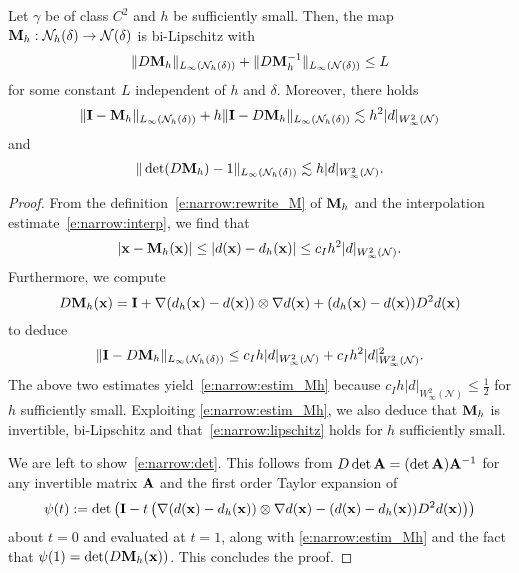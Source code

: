 \begin{lemma}[properties of $\bM_h$]\label{l:narrow:prop_Mh}
Let $\gamma$ be of class $C^2$ and $h$ be sufficiently small.
Then, the map ${\bf M}_h: \mathcal N_h(\delta) \rightarrow \mathcal N(\delta)$ is bi-Lipschitz with
\begin{equation} \label{e:narrow:lipschitz}
\| D{\bf M}_h \|_{L_\infty(\mathcal N_h(\delta))} + \| D{\bf M}_h^{-1} \|_{L_\infty(\mathcal N(\delta))} \leq L
\end{equation}
for some constant $L$ independent of $h$ and $\delta$.
Moreover, there holds
\begin{equation}\label{e:narrow:estim_Mh}
\| {\bf I} - {\bf M}_h \|_{L_\infty(\mathcal N_h(\delta))} + h  \| {\bf I} - D{\bf M}_h \|_{L_\infty(\mathcal N_h(\delta))} \lesssim h^2 | d |_{W^2_\infty(\mathcal N)}
\end{equation}
and
\begin{equation}\label{e:narrow:det}
\| \det(D {\bf M}_h) - 1 \|_{L_\infty(\mathcal N_h(\delta))}  \lesssim h | d |_{W^2_\infty(\mathcal N)}.
\end{equation}
\end{lemma}
\begin{proof}
From the definition~\eqref{e:narrow:rewrite_M} of $\bM_h$ and the interpolation estimate~\eqref{e:narrow:interp}, we find that
$$
| {\bf x} - {\bf M}_h({\bf x}) | \leq  | d({\bf x}) - d_h({\bf x}) | \leq c_I   h^2 | d |_{W^2_\infty(\mathcal N)}.
$$
Furthermore, we compute
$$
D{\bf M}_h({\bf x}) = {\bf I} + \nabla (d_h({\bf x})-d({\bf x})) \otimes \nabla d({\bf x})
+ (d_h({\bf x}) - d({\bf x})) D^2d({\bf x})
$$
to deduce
$$
\| {\bf I} - D{\bf M}_h \|_{L_\infty(\mathcal N_h(\delta))} \leq c_I h | d |_{W^2_\infty(\mathcal N)}
+ c_I h^2 | d |_{W^2_\infty(\mathcal N)}^2.
$$
%
The above two estimates yield~\eqref{e:narrow:estim_Mh} because $c_Ih| d |_{W^2_\infty(\mathcal N)}\le\frac12$ for $h$ sufficiently small. Exploiting \eqref{e:narrow:estim_Mh}, we also deduce that $\bM_h$ is invertible, bi-Lipschitz and that~\eqref{e:narrow:lipschitz} holds for $h$ sufficiently small.

We are left to show~\eqref{e:narrow:det}.
This follows from $D\det{\bf A} = (\det {\bf A}) {\bf A}^{-1}$ for any invertible matrix
${\bf A}$ and the first order Taylor expansion of 
$$
\psi(t) := \det\left({\bf I} -t \left( \nabla (d({\bf x})-d_h({\bf x})) \otimes \nabla d({\bf x}) - (d({\bf x}) - d_h({\bf x})) D^2d({\bf x})\right)\right)
$$ 
about $t=0$ and evaluated at $t=1$, along with \eqref{e:narrow:estim_Mh} and
the fact that $\psi(1)=\det(D{\bf M}_h({\bf x}))$. This concludes the proof.
\end{proof}

